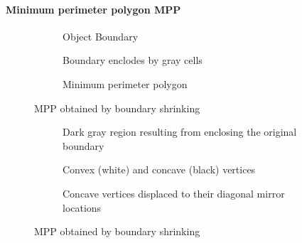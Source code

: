 \paragraph{Minimum perimeter polygon MPP}
\begin{figure}[h]
	\centering
	\begin{subfigure}[b]{0.3\textwidth}
		\centering
		\caption{Object Boundary}
	\end{subfigure}
	\begin{subfigure}[b]{0.3\textwidth}
		\centering
		\caption{Boundary enclodes by gray cells}
	\end{subfigure}
	\begin{subfigure}[b]{0.3\textwidth}
		\centering
		\caption{Minimum perimeter polygon}
	\end{subfigure}
	\caption{MPP obtained by boundary shrinking}
\end{figure}

\begin{figure}[h]
	\centering
	\begin{subfigure}[b]{0.3\textwidth}
		\centering
		\caption{Dark gray region resulting from enclosing the original boundary}
	\end{subfigure}
	\begin{subfigure}[b]{0.3\textwidth}
		\centering
		\caption{Convex (white) and concave (black) vertices}
	\end{subfigure}
	\begin{subfigure}[b]{0.3\textwidth}
		\centering
		\caption{Concave vertices displaced to their diagonal mirror locations}
	\end{subfigure}
	\caption{MPP obtained by boundary shrinking}
\end{figure}

